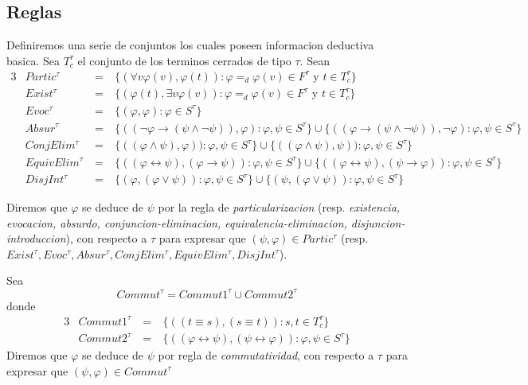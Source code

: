 \subsection{Reglas}
\begin{definition}
  Definiremos una serie de conjuntos los cuales poseen informacion deductiva basica.
  Sea $T_c^\tau$ el conjunto de los terminos cerrados de tipo $\tau$.
  Sean
  \begin{alignat}{3}
    &Partic^\tau &\ =&\ \{(\forall v\varphi(v),\varphi(t)): \varphi =_d\varphi(v)\in F^\tau \text{ y } t\in T_c^\tau\}\\
    &Exist^\tau &\ =&\ \{(\varphi(t),\exists v\varphi(v)): \varphi =_d\varphi(v)\in F^\tau \text{ y } t\in T_c^\tau\}\\    
    &Evoc^\tau &\ =&\ \{(\varphi,\varphi): \varphi\in S^\tau\}\\    
    &Absur^\tau &\ =&\ \{((\neg\varphi\rightarrow(\psi\land\neg\psi)),\varphi): \varphi,\psi \in S^\tau\}\cup\{((\varphi\rightarrow(\psi\land\neg\psi)),\neg\varphi): \varphi,\psi \in S^\tau\}\\
    &ConjElim^\tau &\ =&\ \{((\varphi\land\psi),\varphi)):\varphi,\psi\in S^\tau\}\cup\{((\varphi\land\psi),\psi)):\varphi,\psi\in S^\tau\}\\
    &EquivElim^\tau &\ =&\ \{((\varphi\leftrightarrow\psi),(\varphi\rightarrow\psi)):\varphi,\psi\in S^\tau\}\cup\{((\varphi\leftrightarrow\psi),(\psi\rightarrow\varphi)):\varphi,\psi\in S^\tau\}\\
    &DisjInt^\tau &\ =&\ \{(\varphi, (\varphi\lor\psi)):\varphi,\psi\in S^\tau\}\cup\{(\psi, (\varphi\lor\psi)):\varphi,\psi\in S^\tau\}
  \end{alignat}

  Diremos que $\varphi$ se deduce de $\psi$ por la regla de \emph{particularizacion} (resp. \emph{existencia, evocacion,
  absurdo, conjuncion-eliminacion, equivalencia-eliminacion, disjuncion-introduccion}), con respecto a $\tau$ para expresar que
  $(\psi,\varphi)\in Partic^\tau$ (resp. $Exist^\tau,Evoc^\tau,Absur^\tau,ConjElim^\tau,EquivElim^\tau,DisjInt^\tau$).

  Sea
  $$
  Commut^\tau = Commut1^\tau \cup Commut2^\tau
  $$
  donde 
  \begin{alignat*}{3}
    &Commut1^\tau &\ =&\ \{((t\equiv s), (s\equiv t)):s,t\in T_c^\tau\}\\
    &Commut2^\tau &\ =&\ \{((\varphi\leftrightarrow\psi), (\psi\leftrightarrow\varphi)):\varphi,\psi\in S^\tau\}    
  \end{alignat*}
  Diremos que $\varphi$ se deduce de $\psi$ por regla de \emph{commutatividad}, con respecto a $\tau$
  para expresar que $(\psi,\varphi)\in Commut^\tau$


\end{definition}
